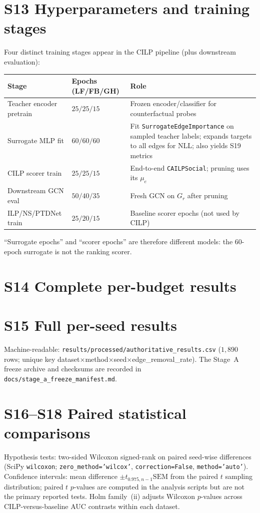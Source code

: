 \documentclass[11pt,a4paper]{article}
\begin{document}
\section{S13 Hyperparameters and training stages}
Four distinct training stages appear in the CILP pipeline (plus downstream evaluation):
\begin{center}\small
\begin{tabular}{@{}p{3.0cm}p{4.2cm}p{5.4cm}@{}}
\toprule
Stage & Epochs (LF/FB/GH) & Role \\
\midrule
Teacher encoder pretrain & $25/25/15$ & Frozen encoder/classifier for counterfactual probes \\
Surrogate MLP fit & $60/60/60$ & Fit \texttt{SurrogateEdgeImportance} on sampled teacher labels; expands targets to all edges for NLL; also yields S19 metrics \\
CILP scorer train & $25/25/15$ & End-to-end \texttt{CAILPSocial}; pruning uses its $\mu_e$ \\
Downstream GCN eval & $50/40/35$ & Fresh GCN on $G_r$ after pruning \\
ILP/NS/PTDNet train & $25/20/15$ & Baseline scorer epochs (not used by CILP) \\
\bottomrule
\end{tabular}
\end{center}
``Surrogate epochs'' and ``scorer epochs'' are therefore different models: the $60$-epoch surrogate is not the ranking scorer.


\section{S14 Complete per-budget results}


\section{S15 Full per-seed results}
Machine-readable: \texttt{results/processed/authoritative\_results.csv}
($1{,}890$ rows; unique key dataset$\times$method$\times$seed$\times$edge\_removal\_rate).
The Stage~A freeze archive and checksums are recorded in \texttt{docs/stage\_a\_freeze\_manifest.md}.

\section{S16--S18 Paired statistical comparisons}
Hypothesis tests: two-sided Wilcoxon signed-rank on paired seed-wise differences (SciPy \texttt{wilcoxon}; \texttt{zero\_method='wilcox'}, \texttt{correction=False}, \texttt{method='auto'}).
Confidence intervals: mean difference $\pm t_{0.975,n-1}\mathrm{SEM}$ from the paired $t$ sampling distribution; paired $t$ $p$-values are computed in the analysis scripts but are not the primary reported tests.
Holm family~(ii) adjusts Wilcoxon $p$-values across CILP-versus-baseline AUC contrasts within each dataset.

\end{document}
